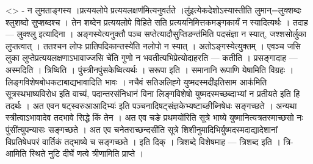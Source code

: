 \textless{}\textgreater{} - न लुमताङ्गस्य ।प्रत्ययलोपे
प्रत्ययलक्षण॑मित्यनुवर्तते ।लु॑इत्येकदेशोऽस्यास्तीति लुमान्=लुक्शब्दः
श्लुशब्दो सुप्शब्दश्च । तेन शब्देन प्रत्ययलोपे विहिते सति
प्रत्ययनिमित्तकमङ्गकार्यं न स्यादित्यर्थः । तदाह --- लुक्श्लु इत्यादिना
। अङ्गस्येत्यनुक्तौ पञ्च सप्तेत्यादौसुप्तिङन्त॑मिति पदसंज्ञा न स्यात्,
जश्शसोर्लुका लुप्तत्वात् । ततश्चन लोपः प्रातिपदिकान्तस्ये॑ति नलोपो न
स्यात् । अतोऽङ्गस्येत्युक्तम् । एवञ्च जसि लुका
लुप्तेप्रत्ययलक्षणाऽभावाज्जसि चे॑ति गुणो न भवतीत्यभिप्रेत्योदाहरति ---
कतीति । प्रसङ्गादाह --- अस्मदिति । त्रिष्विति ।
पुंस्त्रीनपुंसकेष्वित्यर्थः । सरूपा इति । समानानि रूपाणि येषामिति
विग्रहः । लिङ्गविशेषबोधकटाबाद्यभावादिति भावः । नचैवं सतिअलिह्गे
युष्मदस्मदी॑इतिसाम आक॑मिति सूत्रस्थभाष्यविरोध इति वाच्यं,
पदान्तरसंनिधानं विना लिङ्गविशेषो युष्मदस्मच्छब्दाभ्यां न प्रतीयते इति हि
तदर्थः । अत एवन षट्स्वरुआआदिभ्यः॑ इति
पञ्चनादिषट्संज्ञकेभ्यष्टाब्ङीब्निषेधः सङ्गच्छते । अन्यथा
स्त्रीत्वाऽभावादेव तदभावे सिद्धे किं तेन । अत एव चङे प्रथमयो॑रिति सूत्रे
भाष्ये युष्मानित्यत्रतस्माच्छसो नः पुंसी॑त्युपन्यासः सङ्गच्छते । अत एव
चनेतराच्छन्दसी॑ति सूत्रे शिशीनुमादिभिर्युष्मदस्मदाद्यादेशानां
विप्रतिषेधपरं वार्तिकं तद्भाष्ये च सङ्गच्छते । इति दिक् । त्रिशब्दे
विशेषमाह --- त्रिशब्द इति । त्रि-आमिति स्थिते नुटि दीर्घे णत्वे
त्रीणामिति प्राप्ते ।
